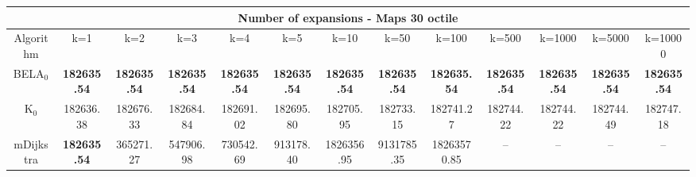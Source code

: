 \begin{tabular}{c|cccccccccccc}\toprule
\multicolumn{13}{c}{Number of expansions - Maps 30 octile}\\ \midrule
Algorithm & k=1 & k=2 & k=3 & k=4 & k=5 & k=10 & k=50 & k=100 & k=500 & k=1000 & k=5000 & k=10000 \\ \midrule
BELA$_0$ & \textbf{182635.54} & \textbf{182635.54} & \textbf{182635.54} & \textbf{182635.54} & \textbf{182635.54} & \textbf{182635.54} & \textbf{182635.54} & \textbf{182635.54} & \textbf{182635.54} & \textbf{182635.54} & \textbf{182635.54} & \textbf{182635.54} \\
K$_0$ & 182636.38 & 182676.33 & 182684.84 & 182691.02 & 182695.80 & 182705.95 & 182733.15 & 182741.27 & 182744.22 & 182744.22 & 182744.49 & 182747.18 \\
mDijkstra & \textbf{182635.54} & 365271.27 & 547906.98 & 730542.69 & 913178.40 & 1826356.95 & 9131785.35 & 18263570.85 & -- & -- & -- & -- \\ \bottomrule 
\end{tabular}
